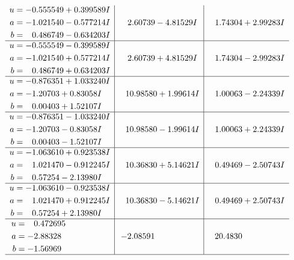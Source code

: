 \documentclass[1p]{elsarticle_modified}
\theoremstyle{definition}
\begin{document}
$$\begin{array}{c|c|c}
\begin{aligned}
u &= -0.555549 + 0.399589 I \\
a &= -1.021540 - 0.577214 I \\
b &= \phantom{-}0.486749 - 0.634203 I\end{aligned}
 & \phantom{-}2.60739 - 4.81529 I & \phantom{-}1.74304 + 2.99283 I \\ \hline\begin{aligned}
u &= -0.555549 - 0.399589 I \\
a &= -1.021540 + 0.577214 I \\
b &= \phantom{-}0.486749 + 0.634203 I\end{aligned}
 & \phantom{-}2.60739 + 4.81529 I & \phantom{-}1.74304 - 2.99283 I \\ \hline\begin{aligned}
u &= -0.876351 + 1.033240 I \\
a &= -1.20703 + 0.83058 I \\
b &= \phantom{-}0.00403 + 1.52107 I\end{aligned}
 & \phantom{-}10.98580 + 1.99614 I & \phantom{-}1.00063 - 2.24339 I \\ \hline\begin{aligned}
u &= -0.876351 - 1.033240 I \\
a &= -1.20703 - 0.83058 I \\
b &= \phantom{-}0.00403 - 1.52107 I\end{aligned}
 & \phantom{-}10.98580 - 1.99614 I & \phantom{-}1.00063 + 2.24339 I \\ \hline\begin{aligned}
u &= -1.063610 + 0.923538 I \\
a &= \phantom{-}1.021470 - 0.912245 I \\
b &= \phantom{-}0.57254 - 2.13980 I\end{aligned}
 & \phantom{-}10.36830 + 5.14621 I & \phantom{-}0.49469 - 2.50743 I \\ \hline\begin{aligned}
u &= -1.063610 - 0.923538 I \\
a &= \phantom{-}1.021470 + 0.912245 I \\
b &= \phantom{-}0.57254 + 2.13980 I\end{aligned}
 & \phantom{-}10.36830 - 5.14621 I & \phantom{-}0.49469 + 2.50743 I \\ \hline\begin{aligned}
u &= \phantom{-}0.472695\phantom{ +0.000000I} \\
a &= -2.88328\phantom{ +0.000000I} \\
b &= -1.56969\phantom{ +0.000000I}\end{aligned}
 & -2.08591\phantom{ +0.000000I} & \phantom{-}20.4830\phantom{ +0.000000I}\\
 \hline 
 \end{array}$$\newpage\newpage\renewcommand{\arraystretch}{1}
\end{document}

